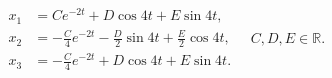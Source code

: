 \[\begin{aligned}
x_1&=Ce^{-2t}+D\cos4t+E\sin4t,\\
x_2&=-\tfrac C4e^{-2t}-\tfrac D2\sin4t+\tfrac E2\cos4t,\\
x_3&=-\tfrac C4e^{-2t}+D\cos4t+E\sin4t.
\end{aligned}\quad C,D,E\in\mathbb R.\]
